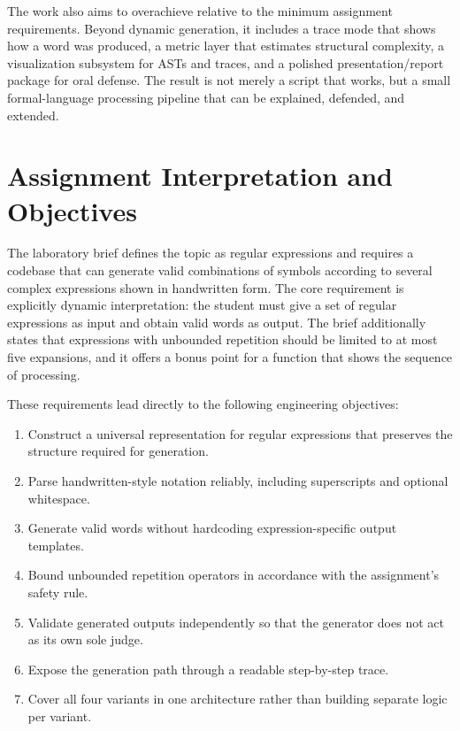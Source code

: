 \documentclass[a4paper,12pt]{article}
\begin{document}
The work also aims to overachieve relative to the minimum assignment requirements. Beyond dynamic generation, it includes a trace mode that shows how a word was produced, a metric layer that estimates structural complexity, a visualization subsystem for ASTs and traces, and a polished presentation/report package for oral defense. The result is not merely a script that works, but a small formal-language processing pipeline that can be explained, defended, and extended.

\section{Assignment Interpretation and Objectives}

The laboratory brief defines the topic as regular expressions and requires a codebase that can generate valid combinations of symbols according to several complex expressions shown in handwritten form. The core requirement is explicitly dynamic interpretation: the student must give a set of regular expressions as input and obtain valid words as output. The brief additionally states that expressions with unbounded repetition should be limited to at most five expansions, and it offers a bonus point for a function that shows the sequence of processing.

These requirements lead directly to the following engineering objectives:

\begin{enumerate}[label=\arabic*.]
    \item Construct a universal representation for regular expressions that preserves the structure required for generation.
    \item Parse handwritten-style notation reliably, including superscripts and optional whitespace.
    \item Generate valid words without hardcoding expression-specific output templates.
    \item Bound unbounded repetition operators in accordance with the assignment's safety rule.
    \item Validate generated outputs independently so that the generator does not act as its own sole judge.
    \item Expose the generation path through a readable step-by-step trace.
    \item Cover all four variants in one architecture rather than building separate logic per variant.
\end{enumerate}
\end{document}
